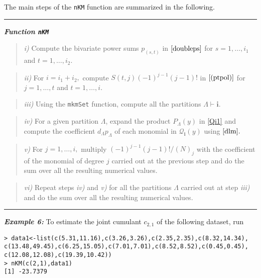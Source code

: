 \hskip-0.5cm The main steps of the \texttt{nKM} function are summarized in the following.

\noindent

\rule{13cm}{0.4pt}

\textbf{\emph{Function \texttt{nKM}}}

\begin{quote}
\emph{i)} Compute the bivariate power sums \(p_{(s,t)}\) in \(\eqref{doubleps}\) for \(s=1, \ldots,i_1\) and \(t=1, \ldots, i_2.\)
\end{quote}

\begin{quote}
\emph{ii)} For \(i=i_1+i_2,\) compute \(S(t,j) (-1)^{j-1} (j-1)!\) in \(\eqref{(ptpol)}\) for \(j=1, \ldots,t\) and \(t=1,\ldots,i.\)
\end{quote}

\begin{quote}
\emph{iii)} Using the \texttt{mkmSet} function, compute all the partitions \(\Lambda \vdash \boldsymbol{i}.\)
\end{quote}

\begin{quote}
\emph{iv)} For a given partition \(\Lambda\), expand the product \(P_{\Lambda}(y)\) in \eqref{Qi1} and compute the coefficient \(d_{\Lambda} p_{\Lambda}\) of each monomial in \({\mathcal Q}_{\boldsymbol{i}}(y)\) using \(\eqref{dlm}.\)
\end{quote}

\begin{quote}
\emph{v)} For \(j=1, \ldots, i,\) multiply \((-1)^{j-1} (j-1)!/(N)_j\) with the coefficient of the monomial of degree \(j\) carried out at the previous step and do the sum over all the resulting numerical values.
\end{quote}

\begin{quote}
\emph{vi)} Repeat steps \emph{iv)} and \emph{v)} for all the partitions
\(\Lambda\) carried out at step \emph{iii)} and do the sum over all the resulting numerical values.
\end{quote}

\noindent

\rule{13cm}{0.4pt}

\hskip-0.5cm\textbf{\emph{Example 6:}} To estimate the joint cumulant \(c_{2,1}\) of the following dataset, run

\begin{verbatim}
> data1<-list(c(5.31,11.16),c(3.26,3.26),c(2.35,2.35),c(8.32,14.34),
c(13.48,49.45),c(6.25,15.05),c(7.01,7.01),c(8.52,8.52),c(0.45,0.45),
c(12.08,12.08),c(19.39,10.42))
> nKM(c(2,1),data1)
[1] -23.7379
\end{verbatim}

